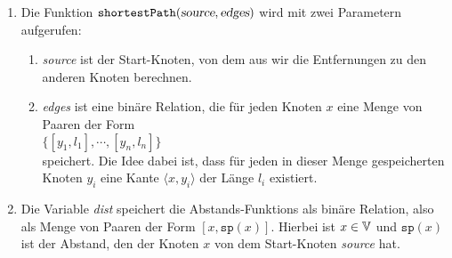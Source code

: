 \noindent
\begin{enumerate}
\item Die Funktion $\mathtt{shortestPath}(\textsl{source}, \textsl{edges})$ wird mit zwei Parametern
      aufgerufen:
      \begin{enumerate}
      \item \textsl{source} ist der Start-Knoten, von dem aus wir die Entfernungen zu den anderen Knoten
            berechnen.
      \item \textsl{edges} ist eine bin\"are Relation, die f\"ur jeden Knoten $x$ eine Menge von Paaren der
            Form
            \\[0.2cm]
            \hspace*{1.3cm}
            $\{ [y_1, l_1], \cdots, [y_n, l_n] \}$
            \\[0.2cm]
            speichert.  Die Idee dabei ist, dass f\"ur jeden in dieser Menge gespeicherten Knoten $y_i$
            eine Kante $\langle x, y_i \rangle$ der L\"ange $l_i$ existiert.
      \end{enumerate}
\item Die Variable \textsl{dist} speichert die Abstands-Funktions als bin\"are Relation, also
      als Menge von Paaren der Form $[x, \mathtt{sp}(x)]$.  Hierbei ist $x \in {\mathbb V}$ und
      $\mathtt{sp}(x)$ ist der Abstand, den der Knoten $x$ von dem Start-Knoten \textsl{source} hat.


\end{enumerate}
